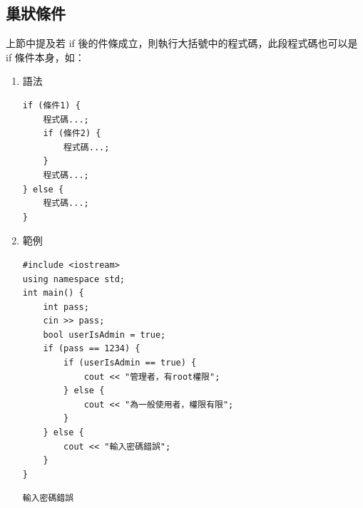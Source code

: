 \documentclass[a4paper,12pt]{article}
\begin{document}
\subsection{巢狀條件}
\label{sec:orgf2f733a}
上節中提及若 if 後的件條成立，則執行大括號中的程式碼，此段程式碼也可以是 if 條件本身，如：\\
\begin{enumerate}
\item 語法
\label{sec:org04a75ea}
\lstset{breaklines=true,language=cpp,label= ,caption= ,captionpos=b,numbers=none}
\begin{lstlisting}
if (條件1) {
    程式碼...;
    if (條件2) {
        程式碼...;
    }
    程式碼...;
} else {
    程式碼...;
}
\end{lstlisting}
\item 範例
\label{sec:orgfe8f385}
\lstset{breaklines=true,language=cpp,label= ,caption= ,captionpos=b,firstnumber=1,numbers=left}
\begin{lstlisting}
#include <iostream>
using namespace std;
int main() {
    int pass;
    cin >> pass;
    bool userIsAdmin = true;
    if (pass == 1234) {
        if (userIsAdmin == true) {
            cout << "管理者，有root權限";
        } else {
            cout << "為一般使用者，權限有限";
        }
    } else {
        cout << "輸入密碼錯誤";
    }
}
\end{lstlisting}

\begin{verbatim}
輸入密碼錯誤
\end{verbatim}


\end{enumerate}
\end{document}
